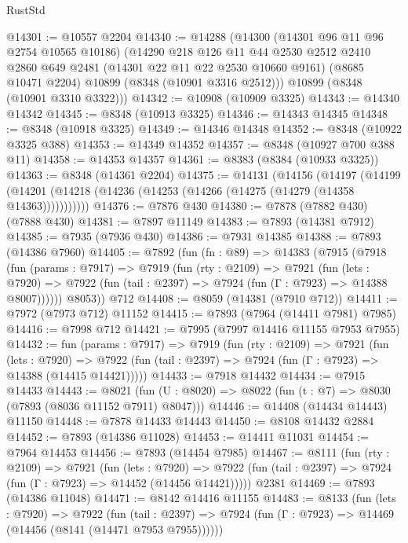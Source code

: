 \begin{lexlean}{RustStd}
\begin{coremodule}
@14301 := @10557 @2204
@14340 := @14288
    (@14300
      (@14301 @96 @11 @96 @2754 @10565 @10186)
      (@14290
        @218
        @126
        @11
        @44
        @2530
        @2512
        @2410
        @2860
        @649
        @2481
        (@14301 @22 @11 @22 @2530 @10660 @9161)
        (@8685 @10471 @2204)
        @10899
        (@8348 (@10901 @3316 @2512)))
      @10899
      (@8348 (@10901 @3310 @3322)))
@14342 := @10908 (@10909 @3325)
@14343 := @14340 @14342
@14345 := @8348 (@10913 @3325)
@14346 := @14343 @14345
@14348 := @8348 (@10918 @3325)
@14349 := @14346 @14348
@14352 := @8348 (@10922 @3325 @388)
@14353 := @14349 @14352
@14357 := @8348 (@10927 @700 @388 @11)
@14358 := @14353 @14357
@14361 := @8383 (@8384 (@10933 @3325))
@14363 := @8348 (@14361 @2204)
@14375 := @14131
    (@14156
      (@14197
        (@14199 (@14201 (@14218 (@14236 (@14253 (@14266 (@14275 (@14279 (@14358 @14363)))))))))))
@14376 := @7876 @430
@14380 := @7878 (@7882 @430) (@7888 @430)
@14381 := @7897 @11149
@14383 := @7893 (@14381 @7912)
@14385 := @7935 (@7936 @430)
@14386 := @7931 @14385
@14388 := @7893 (@14386 @7960)
@14405 := @7892
    (fun (fn : @89) =>
    @14383
      (@7915
        (@7918
          (fun (params : @7917) =>
          @7919
            (fun (rty : @2109) =>
            @7921
              (fun (lets : @7920) =>
              @7922 (fun (tail : @2397) => @7924 (fun (Γ : @7923) => @14388 @8007))))))
        @8053))
    @712
@14408 := @8059 (@14381 (@7910 @712))
@14411 := @7972 (@7973 @712) @11152
@14415 := @7893 (@7964 (@14411 @7981) @7985)
@14416 := @7998 @712
@14421 := @7995 (@7997 @14416 @11155 @7953 @7955)
@14432 := fun (params : @7917) =>
  @7919
    (fun (rty : @2109) =>
    @7921
      (fun (lets : @7920) =>
      @7922 (fun (tail : @2397) => @7924 (fun (Γ : @7923) => @14388 (@14415 @14421)))))
@14433 := @7918 @14432
@14434 := @7915 @14433
@14443 := @8021
    (fun (U : @8020) => @8022 (fun (t : @7) => @8030 (@7893 (@8036 @11152 @7911) @8047)))
@14446 := @14408 (@14434 @14443) @11150
@14448 := @7878 @14433 @14443
@14450 := @8108 @14432 @2884
@14452 := @7893 (@14386 @11028)
@14453 := @14411 @11031
@14454 := @7964 @14453
@14456 := @7893 (@14454 @7985)
@14467 := @8111
    (fun (rty : @2109) =>
    @7921
      (fun (lets : @7920) =>
      @7922 (fun (tail : @2397) => @7924 (fun (Γ : @7923) => @14452 (@14456 @14421)))))
    @2381
@14469 := @7893 (@14386 @11048)
@14471 := @8142 @14416 @11155
@14483 := @8133
    (fun (lets : @7920) =>
    @7922
      (fun (tail : @2397) =>
      @7924 (fun (Γ : @7923) => @14469 (@14456 (@8141 (@14471 @7953 @7955))))))

\end{coremodule}
\end{lexlean}
